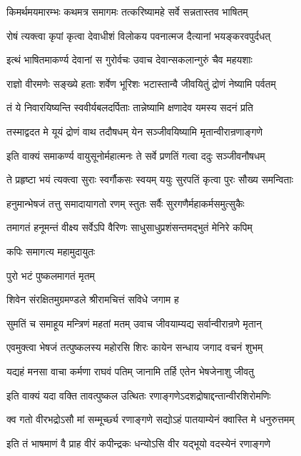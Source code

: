 \twolineshloka
{किमर्थमयमारम्भः कथमत्र समागमः}
{तत्करिष्यामहे सर्वे सन्नतास्तव भाषितम्}%

\twolineshloka
{रोषं त्यक्त्वा कृपां कृत्वा देवाधीशं विलोकय}
{पवनात्मज दैत्यानां भयङ्करवपुर्दधत्}%


\twolineshloka
{इत्थं भाषितमाकर्ण्य देवानां स गुरोर्वचः}
{उवाच देवान्सकलान्गुरुं चैव महयशाः}%

\twolineshloka
{राज्ञो वीरमणेः सङ्ख्ये हताः शर्वेण भूरिशः}
{भटास्तान्वै जीवयितुं द्रोणं नेष्यामि पर्वतम्}%

\twolineshloka
{तं ये निवारयिष्यन्ति स्ववीर्यबलदर्पिताः}
{तान्नेष्यामि क्षणादेव यमस्य सदनं प्रति}%

\twolineshloka
{तस्माद्वदत मे यूयं द्रोणं वाथ तदौषधम्}
{येन सञ्जीवयिष्यामि मृतान्वीरान्रणाङ्गणे}%


\twolineshloka
{इति वाक्यं समाकर्ण्य वायुसूनोर्महात्मनः}
{ते सर्वे प्रणतिं गत्वा ददुः सञ्जीवनौषधम्}%

\twolineshloka
{ते प्रहृष्टा भयं त्यक्त्वा सुराः स्वर्गौकसः स्वयम्}
{ययुः सुरपतिं कृत्वा पुरः सौख्य समन्विताः}%

\twolineshloka
{हनुमान्भेषजं तत्तु समादायागतो रणम्}
{स्तुतः सर्वैः सुरगणैर्महाकर्मसमुत्सुकैः}%

\twolineshloka
{तमागतं हनूमन्तं वीक्ष्य सर्वेऽपि वैरिणः}
{साधुसाधुप्रशंसन्तमद्भुतं मेनिरे कपिम्}%

कपिः समागत्य महामुदायुतः

पुरो भटं पुष्कलमागतं मृतम्

\twolineshloka
{शिवेन संरक्षितमुग्रमण्डले}
{श्रीरामचित्तं सविधे जगाम ह}%

\twolineshloka
{सुमतिं च समाहूय मन्त्रिणं महतां मतम्}
{उवाच जीवयाम्यद्य सर्वान्वीरान्रणे मृतान्}%

\twolineshloka
{एवमुक्त्वा भेषजं तत्पुष्कलस्य महोरसि}
{शिरः कायेन सन्धाय जगाद वचनं शुभम्}%

\twolineshloka
{यद्यहं मनसा वाचा कर्मणा राघवं पतिम्}
{जानामि तर्हि एतेन भेषजेनाशु जीवतु}%

\twolineshloka
{इति वाक्यं यदा वक्ति तावत्पुष्कल उत्थितः}
{रणाङ्गणेऽदशद्रोषाद्दन्तान्वीरशिरोमणिः}%

\twolineshloka
{क्व गतो वीरभद्रोऽसौ मां सम्मूर्च्छ्य रणाङ्गणे}
{सद्योऽहं पातयाम्येनं क्वास्ति मे धनुरुत्तमम्}%

\twolineshloka
{इति तं भाषमाणं वै प्राह वीरं कपीन्द्रकः}
{धन्योऽसि वीर यद्भूयो वदस्येनं रणाङ्गणे}%

